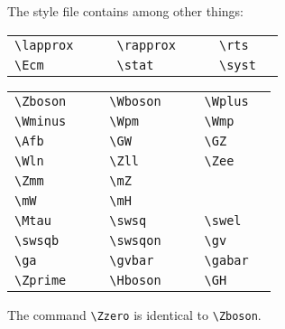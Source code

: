 \documentclass{style/atlasdoc}
\begin{document}
The style file contains among other things:

\medskip

\begin{tabular}{llcllcll}
  \verb+\lapprox+ & \lapprox{} & \hspace{1cm} &
  \verb+\rapprox+ & \rapprox{}  &\hspace{1cm} &
  \verb+\rts+  & \rts{} \\
  \verb+\Ecm+ & \Ecm{} & &
  \verb+\stat+ & \stat{} & &
  \verb+\syst+ & \syst{} \\
\end{tabular}

\medskip

\begin{tabular}{llcllcll}
  \verb+\Zboson+ & \Zboson{} & \hspace{5mm} &
  \verb+\Wboson+ & \Wboson{} & \hspace{5mm} &
  \verb+\Wplus+ & \Wplus{} \\
  \verb+\Wminus+ & \Wminus{} & &
  \verb+\Wpm+ & \Wpm{} & &
  \verb+\Wmp+ & \Wmp{} \\
  \verb+\Afb+ & \Afb{} & &
  \verb+\GW+ & \GW{} & &
  \verb+\GZ+ & \GZ{} \\
  \verb+\Wln+ & \Wln{} & &
  \verb+\Zll+ & \Zll{} & &
  \verb+\Zee+ & \Zee{} \\
  \verb+\Zmm+ & \Zmm{} & &
  \verb+\mZ+ & \mZ{} \\
  \verb+\mW+ & \mW{} & &
  \verb+\mH+ & \mH{} \\
  \verb+\Mtau+ & \Mtau{} & &
  \verb+\swsq+ & \swsq{} & &
  \verb+\swel+ & \swel{} \\
  \verb+\swsqb+ &  \swsqb{} & &
  \verb+\swsqon+ & \swsqon{} & &
  \verb+\gv+ &  \gv{} \\
  \verb+\ga+ & \ga{} & &
  \verb+\gvbar+ & \gvbar{} & &
  \verb+\gabar+ & \gabar{} \\
  \verb+\Zprime+ & \Zprime{} & &
  \verb+\Hboson+ & \Hboson{} & & 
  \verb+\GH+ & \GH{} \\
\end{tabular}

\medskip

\noindent The command \verb+\Zzero+ is identical to \verb+\Zboson+.

\medskip
\end{document}
